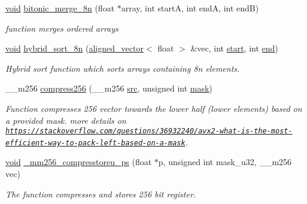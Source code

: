 \begin{DoxyCompactItemize}
\item 
\mbox{\hyperlink{glad_8h_a950fc91edb4504f62f1c577bf4727c29}{void}} \mbox{\hyperlink{namespaceHYBRID__SORT_a5f76d2e085c5ce3b1aac2200c1f42b7b}{bitonic\+\_\+merge\+\_\+8n}} (float $\ast$array, int startA, int endA, int endB)
\begin{DoxyCompactList}\small\item\em function merges ordered arrays \end{DoxyCompactList}\item 
\mbox{\hyperlink{glad_8h_a950fc91edb4504f62f1c577bf4727c29}{void}} \mbox{\hyperlink{namespaceHYBRID__SORT_a3bac6bc8803474e11924ceb1bc74e1ab}{hybrid\+\_\+sort\+\_\+8n}} (\mbox{\hyperlink{type__definitions_8hpp_a087efd587d66b881646ef378f1919c90}{aligned\+\_\+vector}}$<$ float $>$ \&vec, int \mbox{\hyperlink{glad_8h_ac55adc720a3098c1b454d2a4647f4361}{start}}, int \mbox{\hyperlink{glad_8h_a432111147038972f06e049e18a837002}{end}})
\begin{DoxyCompactList}\small\item\em Hybrid sort function which sorts arrays containing 8n elements. \end{DoxyCompactList}\item 
\+\_\+\+\_\+m256 \mbox{\hyperlink{namespaceHYBRID__SORT_ae0a55558c1a67782f1bd0566bb19a185}{compress256}} (\+\_\+\+\_\+m256 \mbox{\hyperlink{glad_8h_a2a98ddb6f79ec1048ff9e15cdd2422ba}{src}}, unsigned int \mbox{\hyperlink{glad_8h_aabeca802167add6b2ea297f3876cec11}{mask}})
\begin{DoxyCompactList}\small\item\em Function compresses 256 vector towards the lower half (lower elements) based on a provided mask.  more details on \href{https://stackoverflow.com/questions/36932240/avx2-what-is-the-most-efficient-way-to-pack-left-based-on-a-mask}{\tt https\+://stackoverflow.\+com/questions/36932240/avx2-\/what-\/is-\/the-\/most-\/efficient-\/way-\/to-\/pack-\/left-\/based-\/on-\/a-\/mask}. \end{DoxyCompactList}\item 
\mbox{\hyperlink{glad_8h_a950fc91edb4504f62f1c577bf4727c29}{void}} \mbox{\hyperlink{namespaceHYBRID__SORT_ad08b967128fe09cc0a71ec0d908af2eb}{\+\_\+mm256\+\_\+compresstoreu\+\_\+ps}} (float $\ast$p, unsigned int mask\+\_\+u32, \+\_\+\+\_\+m256 vec)
\begin{DoxyCompactList}\small\item\em The function compresses and stores 256 bit register. \end{DoxyCompactList}\item 

\end{DoxyCompactItemize}
